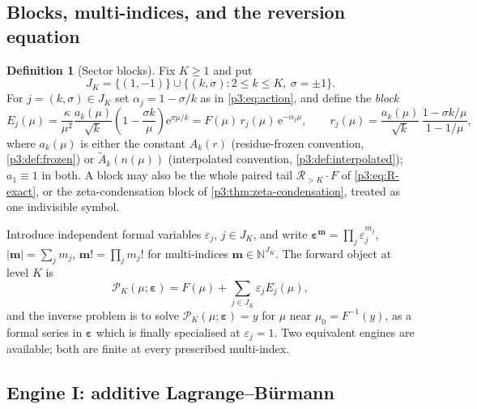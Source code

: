 \documentclass[11pt,a4paper,oneside]{book}
\theoremstyle{plain}
\theoremstyle{definition}
\newtheorem{definition}[theorem]{Definition}
\theoremstyle{remark}
\newcommand{\Nat}{\mathbb{N}}
\newcommand{\e}{\mathrm{e}}
\begin{document}
\subsection{Blocks, multi-indices, and the reversion equation}
\label{p3:sub:blocks}

\begin{definition}[Sector blocks]\label{p3:def:blocks}
Fix $K\ge1$ and put
\begin{equation}\label{p3:eq:JK}
 J_{K}=\{(1,-1)\}\cup\{(k,\sigma):2\le k\le K,\ \sigma=\pm1\}.
\end{equation}
For $j=(k,\sigma)\in J_{K}$ set $\alpha_{j}=1-\sigma/k$ as in \cref{p3:eq:action}, and define the
\emph{block}
\begin{equation}\label{p3:eq:block}
 E_{j}(\mu)=\frac{\kappa}{\mu^{2}}\frac{a_{k}(\mu)}{\sqrt k}
 \left(1-\frac{\sigma k}{\mu}\right)\e^{\sigma\mu/k}
 =F(\mu)\,r_{j}(\mu)\,\e^{-\alpha_{j}\mu},
 \qquad
 r_{j}(\mu)=\frac{a_{k}(\mu)}{\sqrt k}\,\frac{1-\sigma k/\mu}{1-1/\mu},
\end{equation}
where $a_{k}(\mu)$ is either the constant $A_{k}(r)$ (residue-frozen convention,
\cref{p3:def:frozen}) or $\widetilde A_{k}(n(\mu))$ (interpolated convention,
\cref{p3:def:interpolated}); $a_{1}\equiv1$ in both. A block may also be the whole paired tail
$\mathcal{R}_{>K}\cdot F$ of \cref{p3:eq:R-exact}, or the zeta-condensation block of
\cref{p3:thm:zeta-condensation}, treated as one indivisible symbol.
\end{definition}

Introduce independent formal variables $\varepsilon_{j}$, $j\in J_{K}$, and write
$\boldsymbol\varepsilon^{\boldsymbol m}=\prod_{j}\varepsilon_{j}^{m_{j}}$, $|\boldsymbol
m|=\sum_{j}m_{j}$, $\boldsymbol m!=\prod_{j}m_{j}!$ for multi-indices $\boldsymbol
m\in\Nat^{J_{K}}$. The forward object at level $K$ is
\begin{equation}\label{p3:eq:forward-blocks}
 \mathcal{P}_{K}(\mu;\boldsymbol\varepsilon)
 =F(\mu)+\sum_{j\in J_{K}}\varepsilon_{j}E_{j}(\mu),
\end{equation}
and the inverse problem is to solve $\mathcal{P}_{K}(\mu;\boldsymbol\varepsilon)=y$ for $\mu$ near
$\mu_{0}=F^{-1}(y)$, as a formal series in $\boldsymbol\varepsilon$ which is finally specialised
at $\varepsilon_{j}=1$. Two equivalent engines are available; both are finite at every prescribed
multi-index.

\subsection{Engine I: additive Lagrange--B\"urmann}
\end{document}
